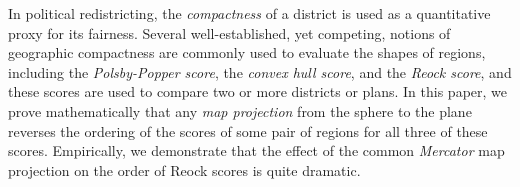 In political redistricting, the \textit{compactness} of a district is
used as a quantitative proxy for its fairness.  Several
well-established, yet competing, notions of geographic compactness are
commonly used to evaluate the shapes of regions, including the
\textit{Polsby-Popper score}, the \textit{convex hull score}, and the \textit{Reock score}, and
these scores are used to compare two or more districts or plans.  In
this paper, we prove mathematically that  any \textit{map
projection} from the sphere to the plane reverses the ordering of the scores of some pair of regions for all three of these scores.  Empirically, we demonstrate that the effect of the common \textit{Mercator} map projection on the order of Reock scores is quite dramatic.

